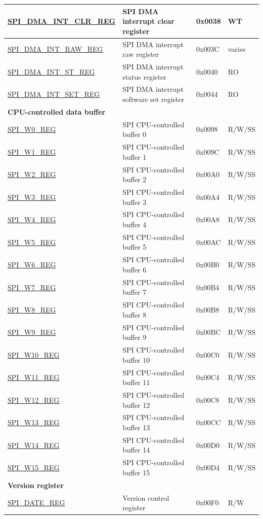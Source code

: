 \begin{longtable}{ | p{5.5cm} | p{7.2cm} | p{1.3cm} | p{1.5cm} | }
\hyperref[regdesc:SPIDMAINTCLRREG]{SPI\_DMA\_INT\_CLR\_REG} & SPI DMA interrupt clear register & 0x0038 & WT \\ \hline
\hyperref[regdesc:SPIDMAINTRAWREG]{SPI\_DMA\_INT\_RAW\_REG} & SPI DMA interrupt raw register & 0x003C & varies \\ \hline
\hyperref[regdesc:SPIDMAINTSTREG]{SPI\_DMA\_INT\_ST\_REG} & SPI DMA interrupt status register & 0x0040 & RO \\ \hline
\hyperref[regdesc:SPIDMAINTSETREG]{SPI\_DMA\_INT\_SET\_REG} & SPI DMA interrupt software set register & 0x0044 & RO \\ \hline
\multicolumn{4}{|l|}{\textbf{CPU-controlled data buffer}} \\ \hline
\hyperref[regdesc:SPIW0REG]{SPI\_W0\_REG} & SPI CPU-controlled buffer 0 & 0x0098 & R/W/SS \\ \hline
\hyperref[regdesc:SPIW1REG]{SPI\_W1\_REG} & SPI CPU-controlled buffer 1 & 0x009C & R/W/SS \\ \hline
\hyperref[regdesc:SPIW2REG]{SPI\_W2\_REG} & SPI CPU-controlled buffer 2 & 0x00A0 & R/W/SS \\ \hline
\hyperref[regdesc:SPIW3REG]{SPI\_W3\_REG} & SPI CPU-controlled buffer 3 & 0x00A4 & R/W/SS \\ \hline
\hyperref[regdesc:SPIW4REG]{SPI\_W4\_REG} & SPI CPU-controlled buffer 4 & 0x00A8 & R/W/SS \\ \hline
\hyperref[regdesc:SPIW5REG]{SPI\_W5\_REG} & SPI CPU-controlled buffer 5 & 0x00AC & R/W/SS \\ \hline
\hyperref[regdesc:SPIW6REG]{SPI\_W6\_REG} & SPI CPU-controlled buffer 6 & 0x00B0 & R/W/SS \\ \hline
\hyperref[regdesc:SPIW7REG]{SPI\_W7\_REG} & SPI CPU-controlled buffer 7 & 0x00B4 & R/W/SS \\ \hline
\hyperref[regdesc:SPIW8REG]{SPI\_W8\_REG} & SPI CPU-controlled buffer 8 & 0x00B8 & R/W/SS \\ \hline
\hyperref[regdesc:SPIW9REG]{SPI\_W9\_REG} & SPI CPU-controlled buffer 9 & 0x00BC & R/W/SS \\ \hline
\hyperref[regdesc:SPIW10REG]{SPI\_W10\_REG} & SPI CPU-controlled buffer 10 & 0x00C0 & R/W/SS \\ \hline
\hyperref[regdesc:SPIW11REG]{SPI\_W11\_REG} & SPI CPU-controlled buffer 11 & 0x00C4 & R/W/SS \\ \hline
\hyperref[regdesc:SPIW12REG]{SPI\_W12\_REG} & SPI CPU-controlled buffer 12 & 0x00C8 & R/W/SS \\ \hline
\hyperref[regdesc:SPIW13REG]{SPI\_W13\_REG} & SPI CPU-controlled buffer 13 & 0x00CC & R/W/SS \\ \hline
\hyperref[regdesc:SPIW14REG]{SPI\_W14\_REG} & SPI CPU-controlled buffer 14 & 0x00D0 & R/W/SS \\ \hline
\hyperref[regdesc:SPIW15REG]{SPI\_W15\_REG} & SPI CPU-controlled buffer 15 & 0x00D4 & R/W/SS \\ \hline
\multicolumn{4}{|l|}{\textbf{Version register}} \\ \hline
\hyperref[regdesc:SPIDATEREG]{SPI\_DATE\_REG} & Version control register& 0x00F0 & R/W \\ \hline
\end{longtable}
